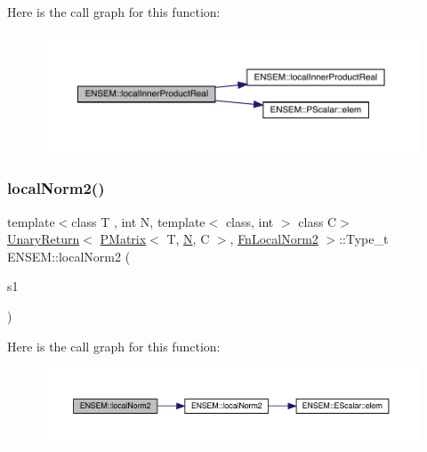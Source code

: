 Here is the call graph for this function\+:\nopagebreak
\begin{figure}[H]
\begin{center}
\leavevmode
\includegraphics[width=350pt]{df/d0a/group__primmatrix_ga8a2b85a888121b8b0ff46870c7705474_cgraph}
\end{center}
\end{figure}
\mbox{\label{group__primmatrix_ga701b80e6864ced6a31a2abc314946f2f}} 
\subsubsection{\texorpdfstring{localNorm2()}{localNorm2()}}
{\footnotesize\ttfamily template$<$class T , int N, template$<$ class, int $>$ class C$>$ \\
\mbox{\hyperlink{structENSEM_1_1UnaryReturn}{Unary\+Return}}$<$ \mbox{\hyperlink{classENSEM_1_1PMatrix}{P\+Matrix}}$<$ T, \mbox{\hyperlink{operator__name__util_8cc_a7722c8ecbb62d99aee7ce68b1752f337}{N}}, C $>$, \mbox{\hyperlink{structENSEM_1_1FnLocalNorm2}{Fn\+Local\+Norm2}} $>$\+::Type\+\_\+t E\+N\+S\+E\+M\+::local\+Norm2 (\begin{DoxyParamCaption}\item[{const \mbox{\hyperlink{classENSEM_1_1PMatrix}{P\+Matrix}}$<$ T, \mbox{\hyperlink{operator__name__util_8cc_a7722c8ecbb62d99aee7ce68b1752f337}{N}}, C $>$ \&}]{s1 }\end{DoxyParamCaption})\hspace{0.3cm}{\ttfamily [inline]}}

Here is the call graph for this function\+:\nopagebreak
\begin{figure}[H]
\begin{center}
\leavevmode
\includegraphics[width=350pt]{df/d0a/group__primmatrix_ga701b80e6864ced6a31a2abc314946f2f_cgraph}
\end{center}
\end{figure}
\mbox{\label{group__primmatrix_ga1635949cdf21523d1c8bdb6d5ada65a8}} 
